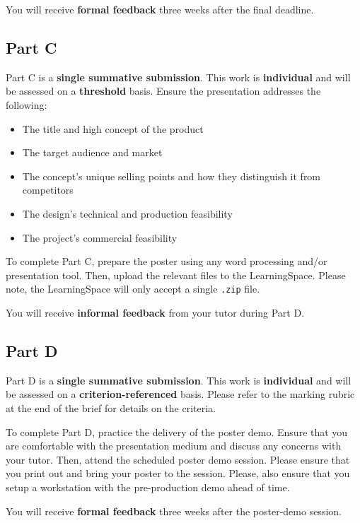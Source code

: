 \documentclass{../../fal_assignment}
\begin{document}
You will receive \textbf{formal feedback} three weeks after the final deadline.

\subsection*{Part C}

Part C is a \textbf{single summative submission}. This work is \textbf{individual} and will be assessed on a \textbf{threshold} basis. Ensure the presentation addresses the following:

\begin{itemize}
	\item The title and high concept of the product
	\item The target audience and market
	\item The concept's unique selling points and how they distinguish it from competitors
	\item The design's technical and production feasibility
	\item The project's commercial feasibility
\end{itemize}

To complete Part C, prepare the poster using any word processing and/or presentation tool. Then, upload the relevant files to the LearningSpace. Please note, the LearningSpace will only accept a single \texttt{.zip} file.

You will receive \textbf{informal feedback} from your tutor during Part D.

\subsection*{Part D}

Part D is a \textbf{single summative submission}. This work is \textbf{individual} and will be assessed on a \textbf{criterion-referenced} basis. Please refer to the marking rubric at the end of the brief for details on the criteria.

To complete Part D, practice the delivery of the poster demo. Ensure that you are comfortable with the presentation medium and discuss any concerns with your tutor. Then, attend the scheduled poster demo session. Please ensure that you print out and bring your poster to the session. Please, also ensure that you setup a workstation with the pre-production demo ahead of time.

You will receive \textbf{formal feedback} three weeks after the poster-demo session.
\end{document}
